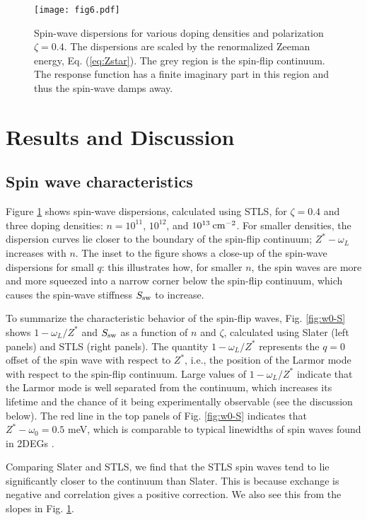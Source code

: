 \documentclass[aps,prb,twocolumn,superscriptaddress]{revtex4-2}
\newcommand{\w}{\omega}
\newcommand{\z}{\zeta}
\begin{document}
\begin{figure}
  \texttt{[image: fig6.pdf]}
  \caption{Spin-wave dispersions for various doping densities and polarization $\z = 0.4$.
          The dispersions are scaled by the renormalized Zeeman energy, Eq. (\ref{eq:Zstar}).
          The grey region is the spin-flip continuum.
          The response function has a finite imaginary part in this region and thus the spin-wave damps away.}
  \label{fig:SW-scaled}
\end{figure}


\section{Results and Discussion}\label{sec4}

\subsection{Spin wave characteristics} \label{sec4A}

Figure \ref{fig:SW-scaled} shows spin-wave dispersions, calculated using STLS, for $\zeta=0.4$ and three doping densities:
$n=10^{11}$, $10^{12}$, and $10^{13}\: \rm cm^{-2}$. For smaller densities, the dispersion curves lie closer to the boundary of the
spin-flip continuum; $Z^*-\omega_L$ increases with $n$. The inset to the figure shows a close-up of the spin-wave dispersions for small $q$:
this illustrates how, for smaller $n$, the spin waves are more and more squeezed into a narrow corner below the spin-flip continuum, which
causes the spin-wave stiffness $S_{\rm sw}$ to increase.

To summarize the characteristic behavior of the spin-flip waves, Fig. \ref{fig:w0-S} shows $1-\omega_L/Z^*$ and $S_{\rm sw}$ as a function of $n$ and $\zeta$,
calculated using Slater (left panels) and STLS (right panels). The quantity $1-\omega_L/Z^*$  represents the $q=0$ offset of the spin wave with respect to $Z^*$,
i.e., the position of the Larmor mode with respect to the spin-flip continuum. Large values of $1-\omega_L/Z^*$ indicate that the Larmor mode is well separated
from the continuum, which increases its lifetime and the chance of it being experimentally observable (see the discussion below).
The red line in the top panels of Fig. \ref{fig:w0-S} indicates that $Z^*-\w_0 = 0.5$ meV, which is comparable to typical linewidths of spin waves found in 2DEGs
\cite{Baboux2012}.

Comparing Slater and STLS, we find that the STLS spin waves tend to lie significantly closer to the continuum than Slater. This is because
exchange is negative and correlation gives a positive correction. We also see this from the slopes in Fig. \ref{fig:SW-scaled}.
\end{document}
